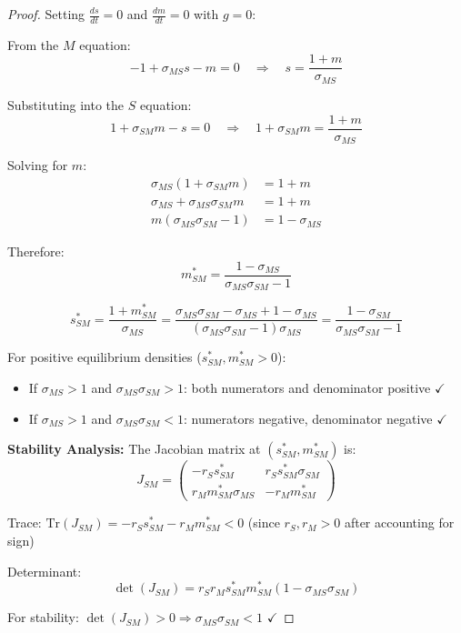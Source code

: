 \documentclass[11pt]{article}
\begin{document}
\begin{proof}
Setting $\frac{ds}{dt} = 0$ and $\frac{dm}{dt} = 0$ with $g = 0$:

From the $M$ equation:
\begin{equation}
-1 + \sigma_{MS} s - m = 0 \quad \Rightarrow \quad s = \frac{1 + m}{\sigma_{MS}}
\end{equation}

Substituting into the $S$ equation:
\begin{equation}
1 + \sigma_{SM} m - s = 0 \quad \Rightarrow \quad 1 + \sigma_{SM} m = \frac{1 + m}{\sigma_{MS}}
\end{equation}

Solving for $m$:
\begin{align}
\sigma_{MS}(1 + \sigma_{SM} m) &= 1 + m \\
\sigma_{MS} + \sigma_{MS}\sigma_{SM} m &= 1 + m \\
m(\sigma_{MS}\sigma_{SM} - 1) &= 1 - \sigma_{MS}
\end{align}

Therefore:
\begin{equation}
\boxed{m^*_{SM} = \frac{1 - \sigma_{MS}}{\sigma_{MS}\sigma_{SM} - 1}}
\end{equation}

\begin{equation}
\boxed{s^*_{SM} = \frac{1 + m^*_{SM}}{\sigma_{MS}} = \frac{\sigma_{MS}\sigma_{SM} - \sigma_{MS} + 1 - \sigma_{MS}}{(\sigma_{MS}\sigma_{SM} - 1)\sigma_{MS}} = \frac{1 - \sigma_{SM}}{\sigma_{MS}\sigma_{SM} - 1}}
\end{equation}

For positive equilibrium densities ($s^*_{SM}, m^*_{SM} > 0$):
\begin{itemize}
    \item If $\sigma_{MS} > 1$ and $\sigma_{MS}\sigma_{SM} > 1$: both numerators and denominator positive $\checkmark$
    \item If $\sigma_{MS} > 1$ and $\sigma_{MS}\sigma_{SM} < 1$: numerators negative, denominator negative $\checkmark$
\end{itemize}

\textbf{Stability Analysis:} The Jacobian matrix at $(s^*_{SM}, m^*_{SM})$ is:
\begin{equation}
J_{SM} = \begin{pmatrix}
-r_S s^*_{SM} & r_S s^*_{SM} \sigma_{SM} \\
r_M m^*_{SM} \sigma_{MS} & -r_M m^*_{SM}
\end{pmatrix}
\end{equation}

Trace: $\text{Tr}(J_{SM}) = -r_S s^*_{SM} - r_M m^*_{SM} < 0$ (since $r_S, r_M > 0$ after accounting for sign)

Determinant:
\begin{equation}
\det(J_{SM}) = r_S r_M s^*_{SM} m^*_{SM} (1 - \sigma_{MS}\sigma_{SM})
\end{equation}

For stability: $\det(J_{SM}) > 0 \Rightarrow \sigma_{MS}\sigma_{SM} < 1$ $\checkmark$
\end{proof}
\end{document}
